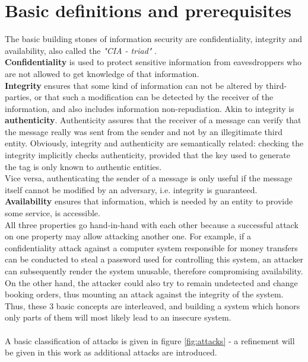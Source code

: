 \section{Basic definitions and prerequisites}

The basic building stones of information security are confidentiality, integrity and availability, also called the \textit{"CIA - triad"} \cite{stallings}.
\\
\textbf{Confidentiality} is used to protect sensitive information from eavesdroppers who are not allowed to get knowledge of that information. 
\\
\textbf{Integrity} ensures that some kind of information can not be altered by third-parties, or that such a modification can be detected by the
receiver of the information, and also includes information non-repudiation.
Akin to integrity is \textbf{authenticity}. Authenticity assures that the receiver of
a message can verify that the message really was sent from the sender and not by an illegitimate third entity. Obviously, integrity and authenticity are semantically
related: checking the integrity implicitly checks authenticity, provided that the key used to generate the tag is only known to authentic entities.
\\
Vice versa, authenticating the sender of a message is only useful if the message itself cannot be modified by an adversary, i.e. integrity is guaranteed.
\textbf{Availability} ensures that information, which is needed by an entity to provide some service, is accessible.
\\
All three properties go hand-in-hand with each other because a successful attack on one property may allow attacking another one. For example, if a
confidentiality attack against a computer system responsible for money transfers can be conducted to steal a password used for controlling this system,
an attacker
can subsequently render the system unusable, therefore compromising availability. On the other hand, the attacker could also try to remain undetected and change
booking orders, thus mounting an attack against the integrity of the system. Thus, these 3 basic concepts are interleaved, and building a system which honors
only parts of them will most likely lead to an insecure system.
\\
\\
A basic classification of attacks is given in figure \ref{fig:attacks} - a refinement will be given in this work as additional attacks are introduced.
